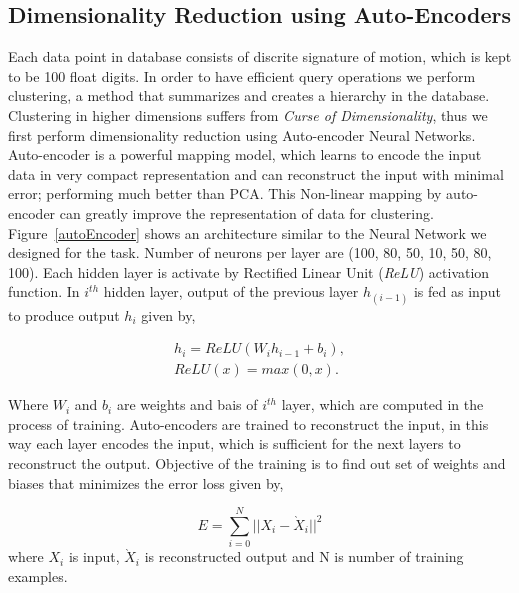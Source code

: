 \documentclass[twocolumn,10pt]{asme2ej}
\begin{document}
\subsection{Dimensionality Reduction using Auto-Encoders}
Each data point in database consists of discrite signature of motion, which is kept to be 100 float digits. In order to have efficient query operations we perform clustering, a method that summarizes and creates a hierarchy in the database.
Clustering in higher dimensions suffers from \emph{Curse of Dimensionality}, thus we first perform dimensionality reduction using Auto-encoder Neural Networks.
Auto-encoder is a powerful mapping model, which learns to encode the input data in very compact representation and can reconstruct the input with minimal error; performing much better than PCA\cite{hinton2006}.
This Non-linear mapping by auto-encoder can greatly improve the representation of data for clustering\cite{song2013}.
Figure~\ref{autoEncoder} shows an architecture similar to the Neural Network we designed for the task.
Number of neurons per layer are (100, 80, 50, 10, 50, 80, 100).
Each hidden layer is activate by Rectified Linear Unit (\emph{ReLU}) activation function.
In $i^{th}$ hidden layer, output of the previous layer $h_(i-1)$ is fed as input to produce output $h_i$ given by,

\begin{eqnarray}\label{nnlayer}
  h_i = ReLU(W_{i}h_{i-1} + b_{i}), \\
  ReLU(x) = max(0, x).
\end{eqnarray}

Where $W_i$ and $b_i$ are weights and bais of $i^{th}$ layer, which are computed in the process of training.
Auto-encoders are trained to reconstruct the input, in this way each layer encodes the input, which is sufficient for the next layers to reconstruct the output.
Objective of the training is to find out set of weights and biases that minimizes the error loss given by,

\begin{equation}\label{nnloss}
  E = \sum_{i=0}^{N} || X_i - \grave{X}_i ||^2
\end{equation}
where $X_i$ is input, $\grave{X}_i$ is reconstructed output and N is number of training examples.
\end{document}
